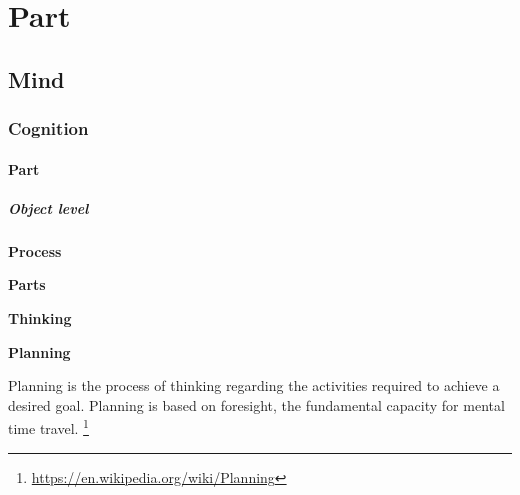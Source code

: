 \documentclass{book}
\newcommand{\seehere}[1]{\href{#1}{see here}}
\providecommand{\ProjectDeepHeading}[2]{%
    \par\medskip\noindent\textbf{#2}\par\smallskip
}
\providecommand{\seehere}[1]{\href{#1}{see here}}
\providecommand{\seeherefooter}[1]{\footnote{\url{#1}}}
\providecommand{\clickurlfooter}[1]{\footnote{\url{#1}}}
\begin{document}

\RequirePackage{xurl}

\makeatletter
{}
\makeatother

\AtBeginDocument{
    \hypersetup{
        colorlinks=true,
        linkcolor=blue,
        urlcolor=blue,
        citecolor=blue
    }
}

\providecommand{\seehere}[1]{\href{\#1}{see here}}
\providecommand{\clickurl}[1]{\href{\#1}{url}}
\providecommand{\seeherefooter}[1]{\href{\#1}{see here}\footnote{\tiny\url{\#1}}}
\providecommand{\clickurlfooter}[1]{\href{\#1}{here}\footnote{\tiny\url{\#1}}}

\section{Part}

\subsection{Mind}

\subsubsection{Cognition}

\paragraph{Part}

\subparagraph{Object level}

\ProjectDeepHeading{1}{Process}

\ProjectDeepHeading{2}{Parts}

\ProjectDeepHeading{3}{Thinking}

\ProjectDeepHeading{4}{Planning}


    
    Planning is the process of thinking regarding the activities required to achieve a desired goal. Planning is based on foresight, the fundamental capacity for mental time travel. \seeherefooter{https://en.wikipedia.org/wiki/Planning}
    
\end{document}
